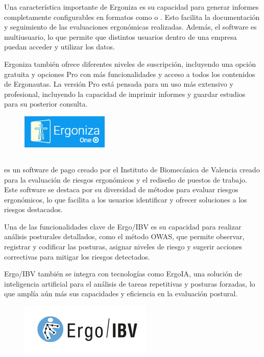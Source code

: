 Una característica importante de Ergoniza es su capacidad para generar informes completamente configurables en formatos como  o . Esto facilita la documentación y seguimiento de las evaluaciones ergonómicas realizadas. Además, el software es multiusuario, lo que permite que distintos usuarios dentro de una empresa puedan acceder y utilizar los datos.

Ergoniza también ofrece diferentes niveles de suscripción, incluyendo una opción gratuita y opciones Pro con más funcionalidades y acceso a todos los contenidos de Ergonautas. La versión Pro está pensada para un uso más extensivo y profesional, incluyendo la capacidad de imprimir informes y guardar estudios para su posterior consulta.

\begin{figure}[ht]
\centering
\includegraphics[scale=.8]{content/img/Logo_Ergoniza.png}
\label{fig:logoErgoniza}
\end{figure}

\subsection*{} %
\label{sec:ergoibv}
 \cite{ergoibv} es un software de pago creado por el Instituto de Biomecánica de Valencia creado para la evaluación de riesgos ergonómicos y el rediseño de puestos de trabajo. Este software se destaca por su diversidad de métodos para evaluar riesgos ergonómicos, lo que facilita a los usuarios identificar y ofrecer soluciones a los riesgos destacados. 

Una de las funcionalidades clave de Ergo/IBV es su capacidad para realizar análisis posturales detallados, como el método OWAS, que permite observar, registrar y codificar las posturas, asignar niveles de riesgo y sugerir acciones correctivas para mitigar los riesgos detectados. 

Ergo/IBV también se integra con tecnologías como ErgoIA, una solución de inteligencia artificial para el análisis de tareas repetitivas y posturas forzadas, lo que amplía aún más sus capacidades y eficiencia en la evaluación postural.

\begin{figure}[ht]
\centering
\includegraphics[scale=.8]{content/img/LogoERGOIBV.png}
\label{fig:logoErgoIBV}
\end{figure}

